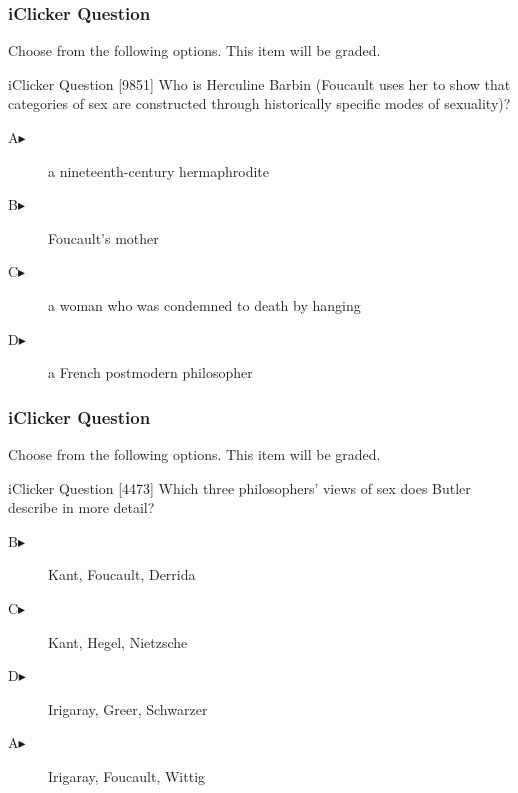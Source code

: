 \documentclass[xcolor=dvipsnames]{beamer}
\begin{document}
\begin{frame}
  \frametitle{iClicker Question}
Choose from the following options. This item will be graded.
\begin{block}{iClicker Question}
[9851]   Who is Herculine Barbin (Foucault uses her to show that categories
  of sex are constructed through historically specific modes of
  sexuality)?
\end{block}
\begin{description}
\item[A\hspace{.2in}$\blacktriangleright$] a nineteenth-century hermaphrodite
\item[B\hspace{.2in}$\blacktriangleright$] Foucault's mother
\item[C\hspace{.2in}$\blacktriangleright$] a woman who was condemned
  to death by hanging
\item[D\hspace{.2in}$\blacktriangleright$] a French postmodern philosopher
\end{description}
\end{frame}


\begin{frame}
  \frametitle{iClicker Question}
Choose from the following options. This item will be graded.
\begin{block}{iClicker Question}
[4473] Which three philosophers' views of sex does Butler describe in more detail?
\end{block}
\begin{description}
\item[B\hspace{.2in}$\blacktriangleright$] Kant, Foucault, Derrida
\item[C\hspace{.2in}$\blacktriangleright$] Kant, Hegel, Nietzsche
\item[D\hspace{.2in}$\blacktriangleright$] Irigaray, Greer, Schwarzer
\item[A\hspace{.2in}$\blacktriangleright$] Irigaray, Foucault, Wittig
\end{description}
\end{frame}
\end{document}
